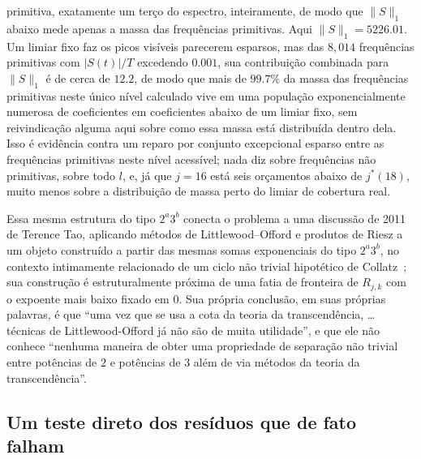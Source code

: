 \documentclass[11pt]{amsart}
\theoremstyle{plain}
\theoremstyle{definition}
\theoremstyle{remark}
\begin{document}
primitiva, exatamente um terço do espectro, inteiramente, de modo que $\|S\|_1$ abaixo mede apenas
a massa das frequências primitivas. Aqui $\|S\|_1=5226.01$. Um limiar fixo faz os picos visíveis
parecerem esparsos, mas das $8{,}014$ frequências primitivas com $|S(t)|/T$ excedendo $0.001$, sua
contribuição combinada para $\|S\|_1$ é de cerca de $12.2$, de modo que mais de $99.7\%$ da massa
das frequências primitivas neste único nível calculado vive em uma população exponencialmente
numerosa de coeficientes em coeficientes abaixo de um limiar fixo, sem reivindicação alguma aqui
sobre como essa massa está distribuída dentro dela. Isso é evidência contra um reparo por conjunto
excepcional esparso entre as frequências primitivas neste nível acessível; nada diz sobre
frequências não primitivas, sobre todo $l$, e, já que $j=16$ está seis orçamentos abaixo de
$j^*(18)$, muito menos sobre a distribuição de massa perto do limiar de cobertura real.

Essa mesma estrutura do tipo $2^a3^b$ conecta o problema a uma discussão de 2011 de Terence Tao,
aplicando métodos de Littlewood--Offord e produtos de Riesz a um objeto construído a partir das
mesmas somas exponenciais do tipo $2^a3^b$, no contexto intimamente relacionado de um ciclo não
trivial hipotético de Collatz~\cite{tao2011blog}; sua construção é estruturalmente próxima de uma
fatia de fronteira de $R_{j,k}$ com o expoente mais baixo fixado em $0$. Sua própria conclusão, em
suas próprias palavras, é que ``uma vez que se usa a cota da teoria da transcendência, \dots{}
técnicas de Littlewood-Offord já não são de muita utilidade'', e que ele não conhece ``nenhuma
maneira de obter uma propriedade de separação não trivial entre potências de $2$ e potências de
$3$ além de via métodos da teoria da transcendência''.

\subsection{Um teste direto dos resíduos que de fato falham}
\end{document}
